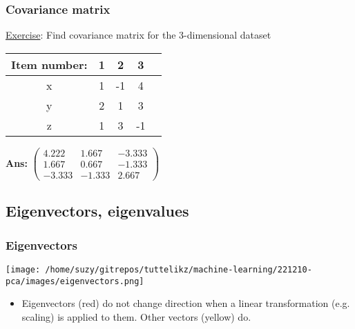 \documentclass{beamer}
\begin{document}
    \begin{frame}
        \frametitle{Covariance matrix}        
        \underline{Exercise}:  Find covariance matrix for the 3-dimensional dataset
        \begin{center}
            \begin{tabular}{ |c|c|c|c|c| } 
            \hline
            Item number: & 1 & 2 & 3 \\
            \hline
            x & 1  & -1 & 4 \\ 
            y & 2  & 1 & 3 \\ 
            z & 1  & 3 & -1 \\ 
            \hline
            \end{tabular}
        \end{center}
        \textbf{Ans: } $\begin{pmatrix}
            4.222 & 1.667 & -3.333 \\
            1.667 & 0.667 & -1.333 \\
            -3.333 & -1.333 & 2.667
        \end{pmatrix}$
\end{frame}


    \subsection{Eigenvectors, eigenvalues}
    \begin{frame}
        \frametitle{Eigenvectors}
        \begin{center}
            \texttt{[image: /home/suzy/gitrepos/tuttelikz/machine-learning/221210-pca/images/eigenvectors.png]}
        \end{center}
        \begin{itemize}
          \item Eigenvectors (red) do not change direction when a linear transformation (e.g. scaling) is applied to them. Other vectors (yellow) do.
        \end{itemize}
    \end{frame}
\end{document}

